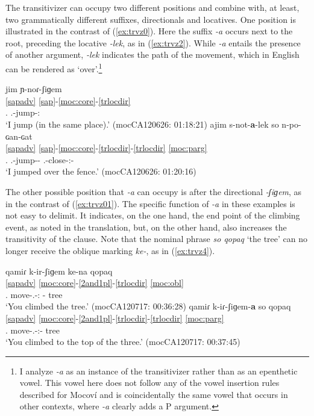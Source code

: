 \documentclass[output=paper]{langscibook}
\begin{document}
 The transitivizer can occupy two different positions and combine with, at least, two grammatically different suffixes, directionals and locatives. One position is illustrated in the contrast of (\ref{ex:trvz0}). Here the suffix \textit{-a} occurs next to the root, preceding the locative \textit{-lek}, as in (\ref{ex:trvz2}). While \textit{-a} entails the presence of another argument, \textit{-lek} indicates the path of the movement, which in English can be rendered as `over'.\footnote{I analyze \textit{-a} as an instance of the transitivizer rather than as an epenthetic vowel. This vowel here does not follow any of the vowel insertion rules described for Mocoví and is coincidentally the same vowel that occurs in other contexts, where \textit{-a} clearly adds a P argument.}
 
\ea \label{ex:trvz0}
\ea \label{ex:trvz1}
\glll jim ɲ-noɾ-ʃiɡem \\
    \ref{sapadv} \ref{sap}-\ref{moc:core}-\ref{trlocdir}\\
      {\First\Sg.\Pron} {\First.\III}-jump-{\Dir}:{\Up}\\
\glt `I jump (in the same place).'
\hfill (mocCA120626: 01:18:21)
\ex \label{ex:trvz2}
\glll ajim s-not-\textbf{a}-lek so n-po-ɢan-ɢat\\     
 \ref{sapadv} \ref{sap}-\ref{moc:core}-\ref{trlocdir}-\ref{trlocdir} \ref{moc:parg}\\
      {\First\Sg.\Pron} {\First.\II}-jump-{\Trvz}-{\LocOne} {\DetTwo} {\Poss.\Ind}-close-{\Vm:\Intr}-{\Ins}\\
\glt `I jumped over the fence.'
\hfill (mocCA120626: 01:20:16)
\z
\z

The other possible position that \textit{-a} can occupy is after the directional \textit{-ʃiɡem}, as in the contrast of (\ref{ex:trvz01}). The specific function of \textit{-a} in these examples is not easy to delimit. It indicates, on the one hand, the end point of the climbing event, as noted in the translation, but, on the other hand, also increases the transitivity of the clause. Note that the nominal phrase \textit{so qopaq} `the tree' can no longer receive the oblique marking \textit{ke-}, as in (\ref{ex:trvz4}).    

\ea \label{ex:trvz01}
\ea \label{ex:trvz3}
\glll qamiɾ k-ir-ʃiɡem ke-na qopaq \\
    \ref{sapadv} \ref{moc:core}-\ref{2and1pl}-\ref{trlocdir} \ref{moc:obl}\\
      {\Second\Sg.\Pron} move-{\Second\Sg.\II}-{\Dir:\Up} {\Obl}-{\DetThree} tree\\
\glt `You climbed the tree.'
\hfill (mocCA120717: 00:36:28)
\ex \label{ex:trvz4}
\glll qamiɾ k-iɾ-ʃiɡem-\textbf{a} so qopaq \\
  \ref{sapadv} \ref{moc:core}-\ref{2and1pl}-\ref{trlocdir}-\ref{trlocdir} \ref{moc:parg}\\
      {\Second\Sg.\Pron} move-{\Second\Sg.\II}-{\Dir:\Up}-{\Trvz} {\DetTwo} tree\\
\glt `You climbed to the top of the three.'
\hfill (mocCA120717: 00:37:45)
\z
\z
\end{document}
